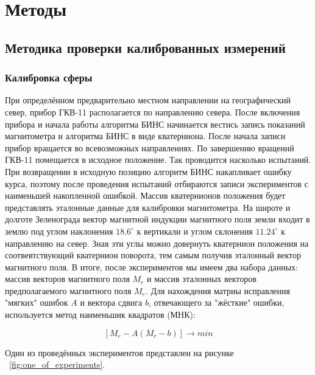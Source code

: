\documentclass[a4paper,12pt]{article}
\begin{document}
\section{Методы}
\subsection{Методика проверки калиброванных измерений}
\subsubsection{Калибровка сферы}
При определённом предварительно местном направлении на географический север, прибор ГКВ-11 располагается по направлению севера. После включения прибора и начала работы алгоритма БИНС начинается вестись запись показаний магнитометра и алгоритма БИНС в виде кватерниона. После начала записи прибор вращается во всевозможных направлениях. По завершению вращений ГКВ-11 помещается в исходное положение. Так проводится насколько испытаний. При возвращении в исходную позицию алгоритм БИНС накапливает ошибку курса, поэтому после проведения испытаний отбираются записи экспериментов с наименьшей накопленной ошибкой. Массив кватернионов положения будет представлять эталонные данные для калибровки магнитометра. На широте и долготе Зеленограда вектор магнитной индукции магнитного поля земли входит в землю под углом наклонения  $18.6^\circ$ к вертикали и углом склонения $11.24^\circ$ к направлению на север. Зная эти углы можно  довернуть кватернион положения на соотвевтствующий кватернион поворота, тем самым получив эталонный вектор магнитного поля. 
В итоге, после экспериментов мы имеем два набора данных: массив векторов магнитного поля $M_r$ и массив эталонных векторов предполагаемого магнитного поля $M_e$. Для нахождения матриы исправления "мягких" ошибок $A$ и вектора сдвига $b$, отвечающего за "жёсткие" ошибки, используется метод наименьшик квадратов (МНК):

\[ \left[ M_e - A\left(
M_r - b \right)
\right] \rightarrow min
\]

Один из проведённых экспериментов представлен на рисунке ~\ref{fig:one_of_experiments}.
\end{document}
